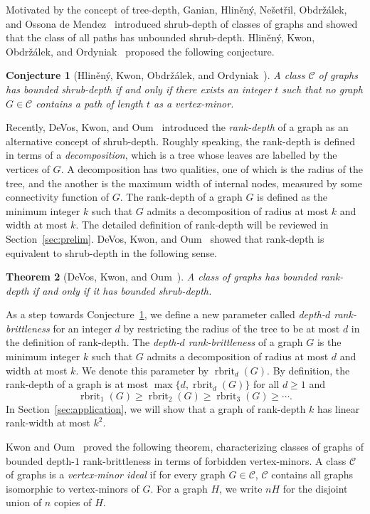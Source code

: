 \documentclass[11pt]{article}
\newtheorem{theorem}{Theorem}[section]
\newtheorem{conjecture}[theorem]{Conjecture}
\newcommand\rbrit{\operatorname{rbrit}}
\begin{document}
Motivated by the concept of tree-depth, 
Ganian, Hlin\v{e}n\'y, Ne{\v{s}}et{\v{r}}il, Obdr\v{z}\'alek, and Ossona de Mendez~\cite{GHNOO2017} introduced
shrub-depth of classes of graphs
and showed that the class of all paths has unbounded shrub-depth.
Hlin{\v{e}}n{\'y}, Kwon, Obdr{\v{z}}{\'a}lek, and Ordyniak~\cite{HlinenyKJS2016}
proposed the following conjecture.
\begin{conjecture}[Hlin{\v{e}}n{\'y}, Kwon, Obdr{\v{z}}{\'a}lek, and Ordyniak~\cite{HlinenyKJS2016}]\label{conj:rankdepth}
 A class $\mathcal{C}$ of graphs has bounded shrub-depth if and only if there exists an integer $t$ such that no graph $G\in \mathcal{C}$ contains a path of length $t$ as a vertex-minor.
 \end{conjecture}
Recently, DeVos, Kwon, and Oum~\cite{DKO2019} introduced the \emph{rank-depth}
of a graph as an alternative concept of shrub-depth. 
Roughly speaking, the rank-depth is defined in terms of 
a \emph{decomposition},
which is a tree whose leaves are labelled by the vertices of $G$.
A decomposition has two qualities, one of which is the radius of the tree,
and the another is the maximum width of internal nodes, measured
by some connectivity function of $G$.
The rank-depth of a graph $G$ is defined as the minimum integer $k$
such that $G$ admits a decomposition of radius at most $k$ and width at most $k$.
The detailed definition of rank-depth will be reviewed in Section~\ref{sec:prelim}.
DeVos, Kwon, and Oum~\cite{DKO2019} showed that
rank-depth is equivalent to shrub-depth in the following sense.
\begin{theorem}[DeVos, Kwon, and Oum~\cite{DKO2019}]
A class of graphs has bounded rank-depth if and only if it has bounded shrub-depth. 
\end{theorem}


As a step towards Conjecture~\ref{conj:rankdepth}, we define a new parameter called \emph{depth-$d$ rank-brittleness} for an integer $d$
by restricting the radius of the tree to be at most $d$ in the
definition of rank-depth.
The \emph{depth-$d$ rank-brittleness} of a graph $G$ is the minimum integer $k$ such that 
$G$ admits a decomposition of radius at most $d$ and width at most $k$.
We denote this parameter by $\rbrit_d(G)$. By definition,
the rank-depth of a graph is at most $\max\{d, \rbrit_d(G)\}$ for all $d\ge 1$ and 
\[\rbrit_1(G)\ge \rbrit_2(G)\ge \rbrit_3(G)\ge \cdots .\]
In Section~\ref{sec:application}, we will show that
a graph of rank-depth $k$ has linear rank-width at most $k^2$.

	Kwon and Oum~\cite{KO2018sca} proved the following theorem,
        characterizing classes of graphs of bounded depth-$1$ rank-brittleness
        in terms of forbidden vertex-minors.
        A class $\mathcal{C}$ of graphs is a \emph{vertex-minor ideal} if 
	for every graph $G\in \mathcal{C}$,
        $\mathcal C$ contains all graphs isomorphic to vertex-minors of $G$.
	For a graph $H$, we write $nH$ for the disjoint union of $n$ copies of $H$. 
\end{document}
